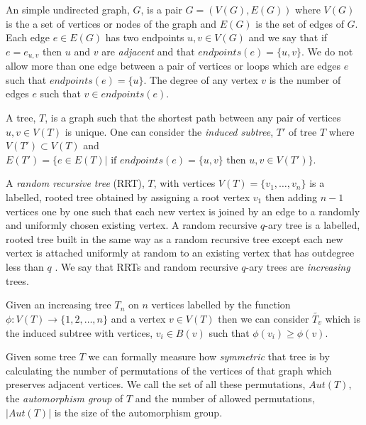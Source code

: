 \documentclass[12pt]{article} %
\theoremstyle{definition}
\begin{document}
An simple undirected graph, $G$, is a pair $G = (V(G),E(G))$ where $V(G)$ is the a set of vertices or nodes of the graph and $E(G)$ is 
the set of edges of $G$.  Each edge $e \in E(G)$ has two endpoints $u,v \in V(G)$ and we say that if $e = e_{u,v}$ then $u$ and $v$ are \emph{adjacent} and that $endpoints(e) = \{u,v\}$.  We do not allow more than one edge between a pair of vertices or loops which are edges $e$ such that $endpoints(e) = \{u\}$. The degree of any vertex $v$ is the number of edges $e$ such that $v \in endpoints(e)$. 

A tree, $T$, is a graph such that the shortest path between any pair of vertices $u,v \in V(T)$ is unique. One can consider the \emph{induced subtree}, $T'$ of tree $T$ where $V(T') \subset V(T)$ and $E(T') = \{e \in E(T)  |  \text{ if } endpoints(e) = \{u,v\} \text{ then } u,v \in V(T')\}$.


A \emph{random recursive tree} (RRT), $T$, with vertices $V(T) = \{v_{1},\dots,v_{n}\}$ is a 
labelled, rooted tree obtained by assigning a root vertex $v_{1}$ then adding $n-1$ vertices 
one by one such that each new vertex is joined by an edge to a randomly and uniformly chosen 
existing vertex. A random recursive $q$-ary tree is a labelled, rooted tree built in the same 
way as a random recursive tree except each new vertex is attached uniformly at random to an 
existing vertex that has outdegree less than $q$ \cite{Berg}.  We say that RRTs and random 
recursive $q$-ary trees are \emph{increasing} trees.  

Given an increasing tree $T_{n}$ on $n$ vertices labelled by the function 
$\phi : V(T) \rightarrow \{1,2,\dots,n\}$ and a vertex $v \in V(T)$ then we can consider 
$\tilde{T_{v}}$  which is the induced subtree with vertices, $v_{i}\in B(v)$ such that 
$\phi(v_{i}) \geq \phi(v)$. 

Given some tree $T$ we can formally measure how \emph{symmetric} that tree is by calculating 
the number of permutations of the vertices of that graph which preserves adjacent vertices.  
We call the set of all these permutations, $Aut(T)$, the \emph{automorphism group} of $T$ and 
the number of allowed permutations, $|Aut(T)|$ is the size of the automorphism group.  
\end{document}

